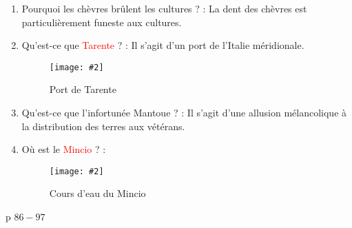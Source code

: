 \documentclass[a4paper, 11pt, hidelinks]{article}
\newcommand{\img}[4]{\begin{figure}[!ht]
    \centering
    \texttt{[image: \#2]}
    \caption{#3}
    \label{#4}
    \end{figure} }
\begin{document}
\begin{enumerate}
{            empêcher qu'aucune parole funeste ne vînt troubler le sacrifice.}
      \item Pourquoi les chèvres brûlent les cultures ? : La dent des chèvres est particulièrement funeste aux cultures.
      \item Qu'est-ce que \textcolor{red}{Tarente} ? : Il s'agit d'un port de l'Italie méridionale.
            \img{0.3}{Tarente.png}{Port de Tarente}{87}
            \newpage
      \item Qu'est-ce que l'infortunée Mantoue ? : Il s'agit d'une allusion mélancolique à la distribution des terres aux vétérans.
      \item Où est le \textcolor{red}{Mincio} ? :
            \img{0.4}{Mincio.png}{Cours d'eau du Mincio}{88}
\end{enumerate}


p $86 - 97$
\end{document}

